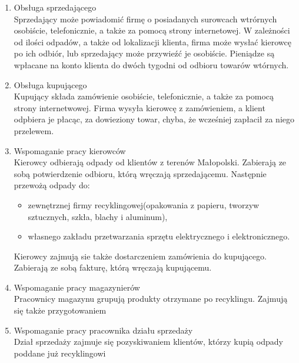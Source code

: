 

\begin{enumerate}
	\item Obsługa sprzedającego \\
	Sprzedający może powiadomić firmę o posiadanych surowcach wtrórnych osobiście, telefonicznie, a także za pomocą strony internetowej. W zależności od ilości odpadów, a także od lokalizacji klienta, firma może wysłać kierowcę po ich odbiór, lub sprzedający może przywieźć je osobiście. Pieniądze są wpłacane na konto klienta do dwóch tygodni od odbioru towarów wtórnych.
	\item Obsługa kupującego \\
	Kupujący składa zamówienie osobiście, telefonicznie, a także za pomocą strony internetwowej. Firma wysyła kierowcę z zamówieniem, a klient odpbiera je płacąc, za dowieziony towar, chyba, że wcześniej zapłacił za niego przelewem.
	\item Wspomaganie pracy kierowców \\
	Kierowcy odbierają odpady od klientów z terenów Małopolski. Zabierają ze sobą potwierdzenie odbioru, którą wręczają sprzedającemu. Następnie przewożą odpady do:
		\begin{itemize}
			\item zewnętrznej firmy recyklingowej(opakowania z papieru, tworzyw sztucznych, szkła, blachy i aluminum),
			\item własnego zakładu przetwarzania sprzętu elektrycznego i elektronicznego.
		\end{itemize}
	Kierowcy zajmują sie także dostarczeniem zamówienia do kupującego. Zabierają ze sobą fakturę, którą wręczają kupującemu.
	\item Wspomaganie pracy magazynierów \\
	Pracownicy magazynu grupują produkty otrzymane po recyklingu. Zajmują się także przygotowaniem 
	\item Wspomaganie pracy pracownika działu sprzedaży \\
	Dział sprzedaży zajmuje się pozyskiwaniem klientów, którzy kupią odpady poddane już recyklingowi
\end{enumerate}
